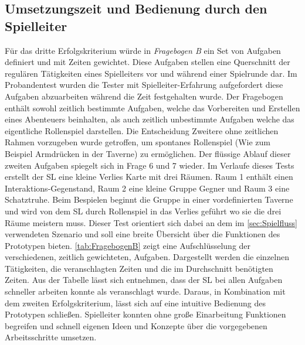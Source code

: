\subsection{Umsetzungszeit und Bedienung durch den Spielleiter}
\label{sec:UmsetzungszeitUndBedienungDurchDenSpielleiter}
Für das dritte Erfolgskriterium würde in \emph{Fragebogen B} ein Set von Aufgaben definiert und mit Zeiten gewichtet. Diese Aufgaben stellen eine Querschnitt der regulären Tätigkeiten eines Spielleiters vor und während einer Spielrunde dar. Im Probandentest wurden die Tester mit Spielleiter-Erfahrung aufgefordert diese Aufgaben abzuarbeiten während die Zeit festgehalten wurde. Der Fragebogen enthält sowohl zeitlich bestimmte Aufgaben, welche das Vorbereiten und Erstellen eines Abenteuers beinhalten, als auch zeitlich unbestimmte Aufgaben welche das eigentliche Rollenspiel darstellen. Die Entscheidung Zweitere ohne zeitlichen Rahmen vorzugeben wurde getroffen, um spontanes Rollenspiel (Wie zum Beispiel Armdrücken in der Taverne) zu ermöglichen. Der flüssige Ablauf dieser zweiten Aufgaben spiegelt sich in Frage 6 und 7 wieder. Im Verlaufe dieses Tests erstellt der SL eine kleine Verlies Karte mit drei Räumen. Raum 1 enthält einen Interaktions-Gegenstand, Raum 2 eine kleine Gruppe Gegner und Raum 3 eine Schatztruhe.\newline
Beim Bespielen beginnt die Gruppe in einer vordefinierten Taverne und wird von dem SL durch Rollenspiel in das Verlies geführt wo sie die drei Räume meistern muss. Dieser Test orientiert sich dabei an dem im \ref{sec:Spielfluss} verwendeten Szenario und soll eine breite Übersicht über die Funktionen des Prototypen bieten.\newline
\ref{tab:FragebogenB} zeigt eine Aufschlüsselung der verschiedenen, zeitlich gewichteten, Aufgaben. Dargestellt werden die einzelnen Tätigkeiten, die veranschlagten Zeiten und die im Durchschnitt benötigten Zeiten. Aus der Tabelle lässt sich entnehmen, dass der SL bei allen Aufgaben schneller arbeiten konnte als veranschlagt wurde. Daraus, in Kombination mit dem zweiten Erfolgskriterium, lässt sich auf eine intuitive Bedienung des Prototypen schließen. Spielleiter konnten ohne große Einarbeitung Funktionen begreifen und schnell eigenen Ideen und Konzepte über die vorgegebenen Arbeitsschritte umsetzen. 

